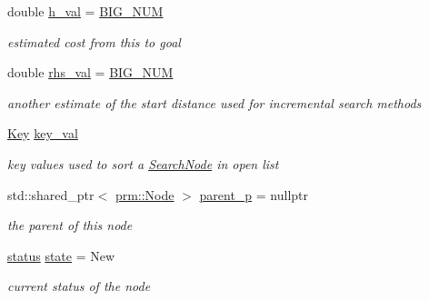 \begin{DoxyCompactItemize}
double \hyperlink{structhsearch_1_1SearchNode_a8e25282237951762ced727eb0097abd9}{h\+\_\+val} = \hyperlink{potential__fields_8hpp_a44b8ad40964aabfb40ae3a0625190475}{B\+I\+G\+\_\+\+N\+UM}
\begin{DoxyCompactList}\small\item\em estimated cost from this to goal \end{DoxyCompactList}\item 
\mbox{\label{structhsearch_1_1SearchNode_a85d37c5e72aa9fd323f68467f60c5eb0}} 
double \hyperlink{structhsearch_1_1SearchNode_a85d37c5e72aa9fd323f68467f60c5eb0}{rhs\+\_\+val} = \hyperlink{potential__fields_8hpp_a44b8ad40964aabfb40ae3a0625190475}{B\+I\+G\+\_\+\+N\+UM}
\begin{DoxyCompactList}\small\item\em another estimate of the start distance used for incremental search methods \end{DoxyCompactList}\item 
\mbox{\label{structhsearch_1_1SearchNode_adc5f4fb44ebe73e41ffdc6c5d22c526b}} 
\hyperlink{structhsearch_1_1Key}{Key} \hyperlink{structhsearch_1_1SearchNode_adc5f4fb44ebe73e41ffdc6c5d22c526b}{key\+\_\+val}
\begin{DoxyCompactList}\small\item\em key values used to sort a \hyperlink{structhsearch_1_1SearchNode}{Search\+Node} in open list \end{DoxyCompactList}\item 
\mbox{\label{structhsearch_1_1SearchNode_ad651df3e918ceb891c294945e9e41598}} 
std\+::shared\+\_\+ptr$<$ \hyperlink{structprm_1_1Node}{prm\+::\+Node} $>$ \hyperlink{structhsearch_1_1SearchNode_ad651df3e918ceb891c294945e9e41598}{parent\+\_\+p} = nullptr
\begin{DoxyCompactList}\small\item\em the parent of this node \end{DoxyCompactList}\item 
\mbox{\label{structhsearch_1_1SearchNode_ae137174b53abd37ea386f3e3d9ebf462}} 
\hyperlink{heuristic__search_8hpp_a544e6b02038f7495f0ef622404fdfd79}{status} \hyperlink{structhsearch_1_1SearchNode_ae137174b53abd37ea386f3e3d9ebf462}{state} = New
\begin{DoxyCompactList}\small\item\em current status of the node \end{DoxyCompactList}\end{DoxyCompactItemize}


